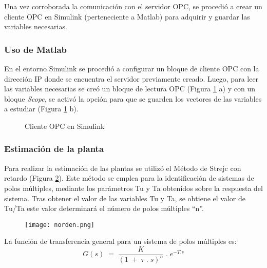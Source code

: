 Una vez corroborada la comunicación con el servidor OPC, se procedió a crear un cliente OPC en Simulink (perteneciente a Matlab) para adquirir y guardar las variables necesarias. 


\subsubsection{Uso de Matlab}
En el entorno Simulink se procedió a configurar un bloque de cliente OPC con la dirección IP donde se encuentra el servidor previamente creado. Luego, para leer las variables necesarias se creó un bloque de lectura OPC (Figura \ref{fig:opcsimu} a) y con un bloque \textit{Scope}, se activó la opción para que se guarden los vectores de las variables a estudiar (Figura \ref{fig:opcsimu} b). 


\begin{figure}[htbp]
	\centering
	\caption{Cliente OPC en Simulink} \label{fig:opcsimu}
\end{figure}



\subsubsection{Estimación de la planta}
Para realizar la estimación de las plantas se utilizó el Método de Strejc con retardo (Figura \ref{fig:norden})\cite{pomares2011sistemas}.
Este método se emplea para la identificación de sistemas de polos múltiples,
mediante los parámetros Tu y Ta obtenidos sobre la respuesta del sistema.
Tras obtener el valor de las variables Tu y Ta, se obtiene el valor de Tu/Ta este valor determinará el número de polos múltiples ``n''. 
\begin{figure}[htb]
	\centering
	\texttt{[image: norden.png]}
	\label{fig:norden}
\end{figure}

La función de transferencia general para un sistema de polos múltiples es:
\begin{equation}
	G(s)\;=\;\frac K{(1\;+\;\tau\;.\;s)^n}\;.\;e^{-T.s}
\end{equation}

